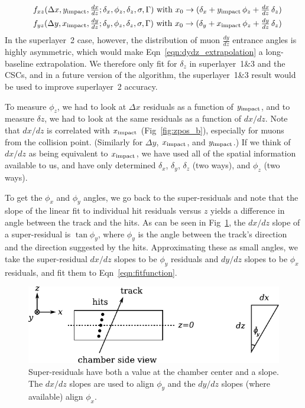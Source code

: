 \documentclass[12pt]{article}
\begin{document}
\begin{eqnarray}
&& f_{xz}(\Delta x, y_{\mbox{\scriptsize impact}}, \tfrac{dx}{dz}; \delta_x, \phi_z, \delta_z, \sigma, \Gamma) \mbox{ with } x_0 \to (\delta_x + y_{\mbox{\scriptsize impact}} \, \phi_z + \tfrac{dx}{dz} \, \delta_z) \\
&& f_{yz}(\Delta y, x_{\mbox{\scriptsize impact}}, \tfrac{dy}{dz}; \delta_y, \phi_z, \delta_z, \sigma, \Gamma) \mbox{ with } x_0 \to (\delta_y + x_{\mbox{\scriptsize impact}} \, \phi_z + \tfrac{dy}{dz} \, \delta_z) \label{eqn:dydz_extrapolation} \label{eqn:last_correction}
\end{eqnarray}
In the superlayer~2 case, however, the distribution of muon
$\tfrac{dy}{dz}$ entrance angles is highly asymmetric, which would
make Eqn~\ref{eqn:dydz_extrapolation} a long-baseline extrapolation.
We therefore only fit for $\delta_z$ in superlayer~1\&3 and the CSCs,
and in a future version of the algorithm, the superlayer~1\&3 result
would be used to improve superlayer~2 accuracy.

To measure $\phi_z$, we had to look at $\Delta x$ residuals as a
function of $y_{\mbox{\scriptsize impact}}$, and to measure $\delta
z$, we had to look at the same residuals as a function of $dx/dz$.
Note that $dx/dz$ is correlated with $x_{\mbox{\scriptsize impact}}$
(Fig~\ref{fig:zpos_b}), especially for muons from the collision point.
(Similarly for $\Delta y$, $x_{\mbox{\scriptsize impact}}$, and
$y_{\mbox{\scriptsize impact}}$.)  If we think of $dx/dz$ as being
equivalent to $x_{\mbox{\scriptsize impact}}$, we have used all of the
spatial information available to us, and have only determined
$\delta_x$, $\delta_y$, $\delta_z$ (two ways), and $\phi_z$ (two ways).

To get the $\phi_x$ and $\phi_y$ angles, we go back to the
super-residuals and note that the slope of the linear fit to
individual hit residuals versus $z$ yields a difference in angle
between the track and the hits.  As can be seen in
Fig~\ref{fig:superresid_slope}, the $dx/dz$ slope of a super-residual
is $\tan\phi_y$, where $\phi_y$ is the angle between the track's
direction and the direction suggested by the hits.  Approximating
these as small angles, we take the super-residual $dx/dz$ slopes to be
$\phi_y$ residuals and $dy/dz$ slopes to be $\phi_x$ residuals, and
fit them to Eqn~\ref{eqn:fitfunction}.
\begin{figure}
\begin{center} \includegraphics{superresidual.pdf} \end{center}
\caption{Super-residuals have both a value at the chamber center and a slope.  The $dx/dz$ slopes are used to align $\phi_y$ and the $dy/dz$ slopes (where available) align $\phi_x$. \label{fig:superresid_slope}}
\end{figure}
\end{document}
